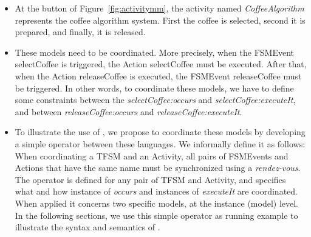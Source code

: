 \begin{itemize}
	\item At the button of Figure~\ref{fig:activitymm}, the activity named \emph{CoffeeAlgorithm} represents the coffee algorithm system. First the coffee is selected, second it is prepared, and finally, it is released.    
	
	\item These models need to be coordinated. More precisely, when the FSMEvent selectCoffee is triggered, the Action selectCoffee must be executed. After that, when the Action releaseCoffee is executed, the FSMEvent releaseCoffee must be triggered. In other words, to coordinate these models, we have to define some constraints between the \mse \emph{selectCoffee:occurs} and \emph{selectCoffee:executeIt}, and between \emph{releaseCoffee:occurs} and \emph{releaseCoffee:executeIt}.
	
	\item To illustrate the use of \bcool, we propose to coordinate these models by developing a simple \bcool operator between these languages. We informally define it as follows: When coordinating a TFSM and an Activity, all pairs of FSMEvents and Actions that have the same name must be synchronized using a \emph{rendez-vous}. The operator is defined for any pair of TFSM and Activity, and specifies what and how instance of \dse \emph{occurs} and instances of \dse \emph{executeIt} are coordinated. When applied it concerns two specific models, at the instance (model) level. In the following sections, we use this simple operator as running example to illustrate the syntax and semantics of \bcool.  	
\end{itemize}






